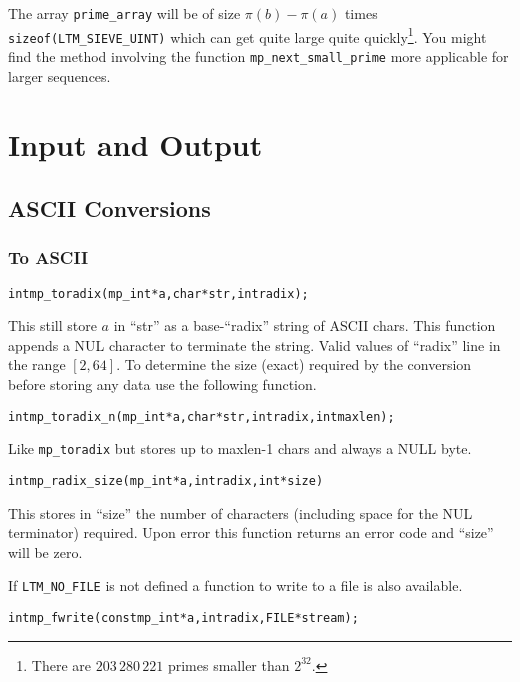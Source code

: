\documentclass[synpaper]{book}
\begin{document}
The array \texttt{prime\_array} will be of size $\pi(b) - \pi(a)$ times \verb!sizeof(LTM_SIEVE_UINT)! which can get quite large quite quickly\footnote{There are $203\,280\,221$ primes smaller than $2^{32}$.}. You might find the method involving the function \texttt{mp\_next\_small\_prime} more applicable for larger sequences.


\chapter{Input and Output}
\section{ASCII Conversions}
\subsection{To ASCII}
\begin{alltt}
int mp_toradix (mp_int * a, char *str, int radix);
\end{alltt}
This still store $a$ in ``str'' as a base-``radix'' string of ASCII chars.  This function appends a NUL character
to terminate the string.  Valid values of ``radix'' line in the range $[2, 64]$.  To determine the size (exact) required
by the conversion before storing any data use the following function.

\begin{alltt}
int mp_toradix_n (mp_int * a, char *str, int radix, int maxlen);
\end{alltt}

Like \texttt{mp\_toradix} but stores up to maxlen-1 chars and always a NULL byte.

\begin{alltt}
int mp_radix_size (mp_int * a, int radix, int *size)
\end{alltt}
This stores in ``size'' the number of characters (including space for the NUL terminator) required.  Upon error this
function returns an error code and ``size'' will be zero.

If \texttt{LTM\_NO\_FILE} is not defined a function to write to a file is also available.
\begin{alltt}
int mp_fwrite(const mp_int *a, int radix, FILE *stream);
\end{alltt}
\end{document}
